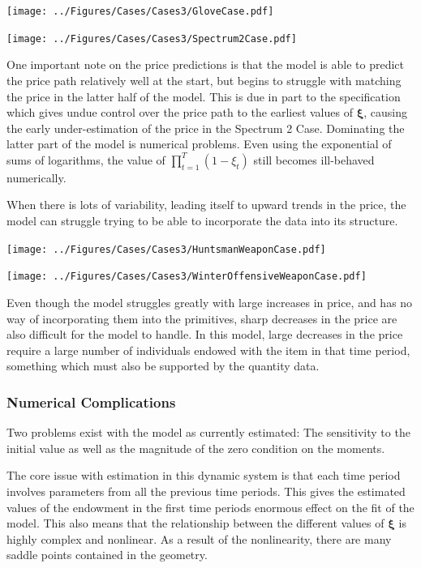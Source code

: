 \documentclass[12pt, letterpaper]{paper}
\begin{document}
\texttt{[image: ../Figures/Cases/Cases3/GloveCase.pdf]}

\texttt{[image: ../Figures/Cases/Cases3/Spectrum2Case.pdf]}

One important note on the price predictions is that the model is able
to predict the price path relatively well at the start, but begins to
struggle with matching the price in the latter half of the model. This
is due in part to the specification which gives undue control over the
price path to the earliest values of $\bm{\xi}$, causing the early
under-estimation of the price in the Spectrum 2 Case. Dominating the
latter part of the model is numerical problems. Even using the
exponential of sums of logarithms, the value of $\prod_{t=1}^T ( 1- \xi_t )$
still becomes ill-behaved numerically.

When there is lots of variability, leading itself to upward trends in
the price, the model can struggle trying to be able to incorporate the
data into its structure.

\texttt{[image: ../Figures/Cases/Cases3/HuntsmanWeaponCase.pdf]}

\texttt{[image: ../Figures/Cases/Cases3/WinterOffensiveWeaponCase.pdf]}

Even though the model struggles greatly with large increases in price, and
has no way of incorporating them into the primitives, sharp decreases
in the price are also difficult for the model to handle. In this
model, large decreases in the price require a large number of
individuals endowed with the item in that time period, something which
must also be supported by the quantity data.

\subsubsection{Numerical Complications}
\label{sec-4-2-1}
Two problems exist with the model as currently estimated: The sensitivity to
the initial value as well as the magnitude of the zero condition on
the moments.

The core issue with estimation in this dynamic system is that each
time period involves parameters from all the previous time
periods. This gives the estimated values of the endowment in the first
time periods enormous effect on the fit of the model. This also means
that the relationship between the different values of $\bm{\xi}$ is highly
complex and nonlinear. As a result of the nonlinearity, there are many
saddle points contained in the geometry.
\end{document}
